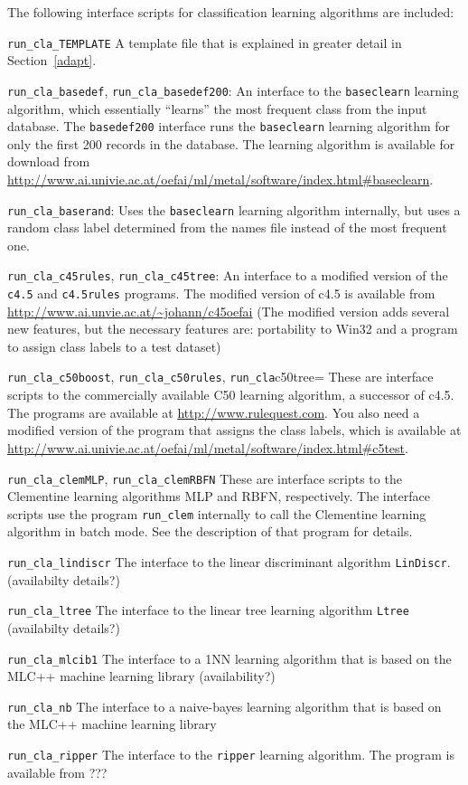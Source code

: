 \documentclass[a4paper,10pt,twoside]{article}
\newenvironment{optionlist}
{\begin{list}{}
    {\setlength{\itemsep}{0em plus0em minus0ex}
      \setlength{\parsep}{0ex}
      \setlength{\topsep}{0em}
      \setlength{\leftmargin}{2em}
      \setlength{\listparindent}{0em}
      \setlength{\itemindent}{-2em}
      \setlength{\partopsep}{0ex}
    }}
  {\end{list}}
\begin{document}
The following interface scripts for classification learning
algorithms are included:
\begin{optionlist}
\item \verb=run_cla_TEMPLATE= A template file that is explained 
  in greater detail in Section~\ref{adapt}.
\item \verb=run_cla_basedef=, \verb=run_cla_basedef200=:
An interface to the \texttt{baseclearn} learning 
algorithm, which essentially ``learns'' the most frequent class
from the input database. The \texttt{basedef200} interface
runs the \texttt{baseclearn} learning algorithm for only the
first 200 records in the database. The learning algorithm
is available for download from \url{http://www.ai.univie.ac.at/oefai/ml/metal/software/index.html#baseclearn}.
\item \verb=run_cla_baserand=: Uses the \texttt{baseclearn} learning algorithm
internally, but uses
a random class label determined from the names file instead 
of the most frequent one.
\item \verb=run_cla_c45rules=, \verb=run_cla_c45tree=: 
An interface to a modified
version of the \texttt{c4.5} and \texttt{c4.5rules} programs. 
The modified version of c4.5 is available from \url{http://www.ai.unvie.ac.at/~johann/c45oefai} (The modified version adds several new features, but 
the necessary features are: portability to Win32 and a program to
assign class labels to a test dataset)
\item \verb=run_cla_c50boost=, \verb=run_cla_c50rules=, \verb=run_cla=c50tree=
These are interface scripts to the commercially available C50 learning
algorithm, a successor of c4.5. The programs are available at 
\url{http://www.rulequest.com}. You also need a modified 
version of the program that assigns the class labels, which is
available at \url{http://www.ai.univie.ac.at/oefai/ml/metal/software/index.html#c5test}.
\item \verb=run_cla_clemMLP=, \verb=run_cla_clemRBFN=
  These are interface scripts to the Clementine learning algorithms
 MLP and RBFN, respectively. The interface  scripts use the
program \verb=run_clem= internally to call the Clementine learning 
algorithm in batch mode. See the description of that program for
details.
\item \verb=run_cla_lindiscr= The interface to the linear discriminant
 algorithm \texttt{LinDiscr}. (availabilty details?)
\item \verb=run_cla_ltree= The interface to the linear tree learning 
algorithm \texttt{Ltree} (availabilty details?)
\item \verb=run_cla_mlcib1= The interface to a 1NN learning algorithm
that is based on the MLC++ machine learning library (availability?)
\item \verb=run_cla_nb= The interface to a naive-bayes learning algorithm
  that is based on the MLC++ machine learning library
\item \verb=run_cla_ripper= The interface to the \texttt{ripper}
learning algorithm. The program is available from  ???
\end{optionlist}
\end{document}
